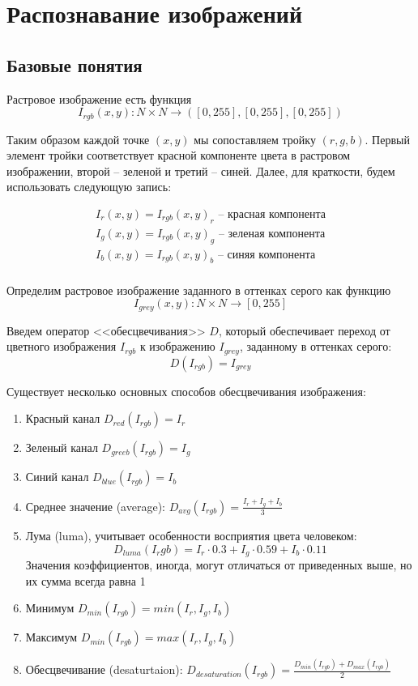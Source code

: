 \chapter{Распознавание изображений}
\section{Базовые понятия}
\begin{definition}
Растровое изображение есть функция $$I_{rgb}(x,y): N \times N \to([0,255],[0,255],[0,255])$$ 
\end{definition}
Таким образом каждой точке $(x,y)$ мы сопоставляем тройку $(r,g,b)$. Первый элемент тройки соответствует красной компоненте цвета в растровом изображении, второй -- зеленой и третий -- синей. Далее, для краткости, будем использовать следующую запись:

$$
\begin{array}{l}
I_r(x,y) = I_{rgb}(x,y)_r \text{ -- красная компонента}\\
I_g(x,y) = I_{rgb}(x,y)_g \text{ -- зеленая компонента}\\
I_b(x,y) = I_{rgb}(x,y)_b \text{ -- синяя компонента}\\
\end{array}
$$

\begin{definition}
Определим растровое изображение заданного в оттенках серого как функцию
$$I_{grey}(x,y): N \times N \to[0,255]$$
\end{definition}

\begin{definition}
Введем оператор <<обесцвечивания>> $D$, который обеспечивает переход от цветного изображения $I_{rgb}$ к изображению $I_{grey}$, заданному в оттенках серого:
$$D(I_{rgb}) = I_{grey}$$
\end{definition}

Существует несколько основных способов обесцвечивания изображения:
\begin{enumerate}
 \item Красный канал $D_{red}(I_{rgb}) = I_r$
 \item Зеленый канал $D_{greeb}(I_{rgb}) = I_g$
 \item Синий канал $D_{blue}(I_{rgb}) = I_b$  
 \item Среднее значение (average): $D_{avg}(I_{rgb}) = \frac{I_r + I_g + I_b}{3}$
 \item Лума (luma), учитывает особенности восприятия цвета человеком: $$D_{luma}(I_rgb) = I_r\cdot0.3 + I_g\cdot0.59 + I_b\cdot0.11$$
 		Значения коэффициентов, иногда, могут отличаться от приведенных выше, но их сумма всегда равна 1
 \item Минимум  $D_{min}(I_{rgb}) = min(I_r, I_g, I_b)$
 \item Максимум  $D_{min}(I_{rgb}) = max(I_r, I_g, I_b)$
 \item Обесцвечивание (desaturtaion): $D_{desaturation}(I_{rgb}) = \frac{D_{min}(I_{rgb}) + D_{max}(I_{rgb})}{2}$
\end{enumerate}

